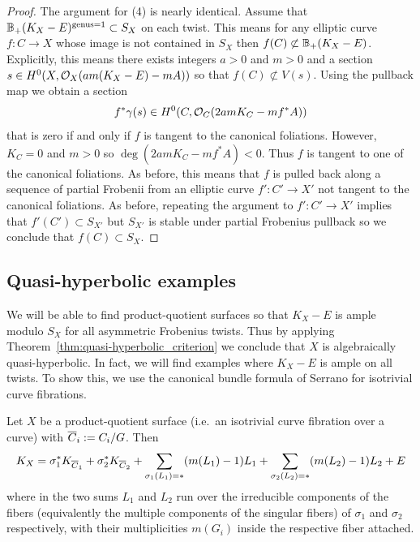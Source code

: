 \documentclass[main.tex]{subfiles}
\begin{document}
\begin{proof}
\par 
The argument for (4) is nearly identical. Assume that $\mathbb{B}_{+}(K_X - E)^{\mathrm{genus} = 1} \subset S_X$ on each twist. This means for any elliptic curve $f : C \to X$ whose image is not contained in $S_X$ then $f(C) \not\subset \mathbb{B}_{+}(K_X - E)$. Explicitly, this means there exists integers $a > 0$ and $m > 0$ and a section $s \in H^0(X, \mathcal{O}_X(am(K_X - E) - m A))$ so that $f(C) \not\subset V(s)$. Using the pullback map we obtain a section
\[ f^* \gamma(s) \in H^0(C, \mathcal{O}_C(2 am K_C - m f^* A)) \]
that is zero if and only if $f$ is tangent to the canonical foliations. However, $K_C = 0$ and $m > 0$ so $\deg{(2 am K_C - m f^* A)} < 0$. Thus $f$ is tangent to one of the canonical foliations. As before, this means that $f$ is pulled back along a sequence of partial Frobenii from an elliptic curve $f' : C' \to X'$ not tangent to the canonical foliations. As before, repeating the argument to $f' : C' \to X'$ implies that $f'(C') \subset S_{X'}$ but $S_{X'}$ is stable under partial Frobenius pullback so we conclude that $f(C) \subset S_{X}$.
\end{proof}

\subsection{Quasi-hyperbolic examples}

We will be able to find product-quotient surfaces so that $K_X - E$ is ample modulo $S_X$ for all asymmetric Frobenius twists. Thus by applying Theorem~\ref{thm:quasi-hyperbolic_criterion} we conclude that $X$ is algebraically quasi-hyperbolic. In fact, we will find examples where $K_X - E$ is ample on all twists. To show this, we use the canonical bundle formula of Serrano for isotrivial curve fibrations.

\begin{theorem}\cite[Theorem~4.1]{serrano:isotrivial_fibered_surfaces}
Let $X$ be a product-quotient surface (i.e.\ an isotrivial curve fibration over a curve) with $\overline{C}_i := C_i / G$. Then
\[ K_X = \sigma_1^* K_{\overline{C}_1} + \sigma_2^* K_{\overline{C}_2} + \sum_{\sigma_1(L_1) = *} (m(L_1) - 1) L_1 + \sum_{\sigma_2(L_2) = *} (m(L_2) - 1) L_2 + E \]
where in the two sums $L_1$ and $L_2$ run over the irreducible components of the fibers (equivalently the multiple components of the singular fibers) of $\sigma_1$ and $\sigma_2$ respectively, with their multiplicities $m(G_i)$ inside the respective fiber attached. 
\end{theorem}
\end{document}
